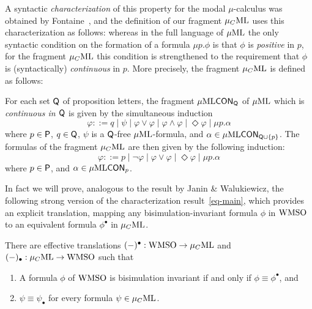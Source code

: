 
A syntactic \emph{characterization} of this property for the modal $\mu$-calculus
was obtained by Fontaine~\cite{Fontaine08,FV12}, and the definition of our fragment $\mu_{C}\mathrm{ML}$
uses this characterization as follows:
whereas in the full language of $\mu\mathrm{ML}$ the only syntactic condition on the
formation of a formula $\mu p. \phi$ is that $\phi$ is \emph{positive} in $p$,
for the fragment $\mu_{C}\mathrm{ML}$ this condition is strengthened to the requirement that
$\phi$ is (syntactically) \emph{continuous} in $p$.
More precisely, the fragment $\mu_{C}\mathrm{ML}$ is defined as follows:

\begin{definition}
For each set $\mathsf{Q}$ of
proposition letters, the fragment $\mu\mathrm{ML}\mathsf{CON}_{\mathsf{Q}}$ of $\mu\mathrm{ML}$ which is \emph{continuous in $\mathsf{Q}$}
is given by the simultaneous induction
\begin{equation*}
   \varphi ::= q
   \mid \psi
   \mid \varphi \lor \varphi
   \mid \varphi \land \varphi
   \mid \Diamond \varphi
   \mid \mu p.\alpha
\end{equation*}
where $p\in\mathsf{P}$, $q \in \mathsf{Q}$, $\psi$ is a $\mathsf{Q}$-free $\mu\mathrm{ML}$-formula, and
$\alpha \in \mu\mathrm{ML}\mathsf{CON}_{\mathsf{Q}\cup\{p\}}$.
%
The formulas of the fragment $\mu_{C}\mathrm{ML}$ are then given by the following induction:
\begin{equation*}
   \varphi ::= p \mid \lnot \varphi
    \mid \varphi \lor \varphi
    \mid  \Diamond \varphi
    \mid \mu p.\alpha
\end{equation*}
where $p \in \mathsf{P}$, and $\alpha \in \mu\mathrm{ML}\mathsf{CON}_{p}$.
\end{definition}

In fact we will prove, analogous to the result by Janin \& Walukiewicz,
the following strong version of the characterization result~\eqref{eq-main},
which provides an explicit translation, mapping any
bisimulation-invariant formula $\phi$ in $\mathrm{WMSO}$ to an equivalent formula
$\phi^{\bullet}$ in $\mu_{C}\mathrm{ML}$.

\begin{theorem}
\label{t:m1}
There are effective translations $(-)^{\bullet}: \mathrm{WMSO} \to \mu_{C}\mathrm{ML}$ and
$(-)_{\bullet}: \mu_{C}\mathrm{ML} \to \mathrm{WMSO}$ such that 
\begin{enumerate}
\item A formula $\phi$ of $\mathrm{WMSO}$ is
bisimulation invariant if and only if $\phi \equiv \phi^{\bullet}$, and
\item $\psi \equiv \psi_{\bullet}$ for every formula $\psi \in \mu_{C}\mathrm{ML}$.
\end{enumerate}
\end{theorem}

